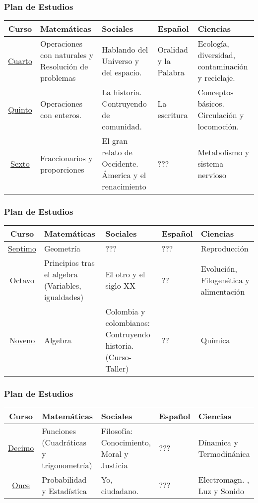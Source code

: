 \documentclass{beamer}
\begin{document}
\begin{frame}
\fontsize{9pt}{10}\selectfont
\frametitle{Plan de Estudios}
\begin{table}
\centering
\begin{tabular}{|c|p{2cm}|p{2cm}|p{2cm}|p{2cm}|}
\hline 
\textbf{Curso} & \textbf{Matem\'aticas} &\textbf{Sociales} &\textbf{Espa\~nol} & \textbf{Ciencias}\\
\hline
\underline{Cuarto} & Operaciones con naturales y Resoluci\'on de problemas   & Hablando del Universo y del espacio.  & Oralidad y la Palabra & Ecolog\'ia, diversidad, contaminaci\'on y reciclaje.  \\
\underline{Quinto} & Operaciones con enteros.  & La historia. Contruyendo de comunidad. & La escritura &Conceptos b\'asicos. Circulaci\'on y locomoci\'on.  \\
\underline{Sexto} & Fraccionarios y proporciones & El gran relato de Occidente. \'America y el renacimiento  & ??? & Metabolismo y sistema nervioso \\
\hline
\end{tabular}
\end{table}
\end{frame}


\begin{frame}
\fontsize{9pt}{10}\selectfont
\frametitle{Plan de Estudios}
\begin{table}
\centering
\begin{tabular}{|c|p{2cm}|p{2cm}|p{2cm}|p{2cm}|}
\hline 
\textbf{Curso} & \textbf{Matem\'aticas} &\textbf{Sociales} &\textbf{Espa\~nol} & \textbf{Ciencias}\\
\hline
\underline{Septimo} & Geometr\'ia & ??? & ???& Reproducci\'on \\
\underline{Octavo} & Principios tras el algebra (Variables, igualdades)  &El otro y el siglo XX & ??& Evoluci\'on, Filogen\'etica y  alimentaci\'on \\
\underline{Noveno} & Algebra & Colombia y colombianos: Contruyendo historia. (Curso-Taller)  & ??& Qu\'imica \\
\hline 
\end{tabular}
\end{table}
\end{frame}
\begin{frame}
\fontsize{9pt}{10}\selectfont
\frametitle{Plan de Estudios}
\begin{table}
\centering
\begin{tabular}{|c|p{2cm}|p{2cm}|p{2cm}|p{2cm}|}
\hline 
\textbf{Curso} & \textbf{Matem\'aticas} &\textbf{Sociales} &\textbf{Espa\~nol} & \textbf{Ciencias}\\
\hline
\underline{Decimo} & Funciones (Cuadr\'aticas y trigonometr\'ia)  & Filosof\'ia: Conocimiento, Moral y Justicia & ???& D\'inamica y Termodin\'anica\\
\underline{Once} & Probabilidad y Estad\'istica & Yo, ciudadano. & ??? & Electromagn. , Luz y Sonido \\
\hline 
\end{tabular}
\end{table}
\end{frame}
\end{document}
